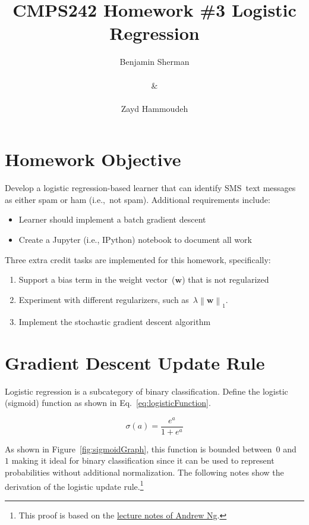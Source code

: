 \documentclass{report}
\title{\textbf{CMPS242 Homework \#3 \textendash{} Logistic Regression}}
\author{Benjamin Sherman \\~\\ \& \\~\\ Zayd Hammoudeh}
\newcommand{\norm}[1]{\left\lVert#1\right\rVert}
\newcommand{\w}{\mathbf{w}}
\begin{document}
  \maketitle
  
  \suppressfloats
  \section{Homework Objective}
  
  Develop a logistic regression-based learner that can identify SMS~text messages as either spam or ham (i.e.,~not spam).  Additional requirements include:
  
  \begin{itemize}
    \setlength\itemsep{0pt}
    \item Learner should implement a batch gradient descent
    \item Create a Jupyter (i.e., IPython) notebook to document all work
  \end{itemize}

  \noindent
  Three extra credit tasks are implemented for this homework, specifically:
  
  \begin{enumerate}
    \setlength\itemsep{0pt}
    \item Support a bias term in the weight vector~($\mathbf{w}$) that is not regularized
    \item Experiment with different regularizers, such as~$\lambda\norm{\w}_1$.
    \item Implement the stochastic gradient descent algorithm
  \end{enumerate}
 
  \section{Gradient Descent Update Rule}
  
  Logistic regression is a subcategory of binary classification.  Define the logistic (sigmoid) function as shown in Eq.~\eqref{eq:logisticFunction}.
  
  \begin{equation}
    \sigma(a) = \frac{e^{a}}{1+e^{a}}\label{eq:logisticFunction}
  \end{equation}
  
  \noindent
  As shown in Figure~\ref{fig:sigmoidGraph}, this function is bounded between~$0$ and~$1$ making it ideal for binary classification since it can be used to represent probabilities without additional normalization. The following notes show the derivation of the logistic update rule.\footnote{This proof is based on the \href{http://cs229.stanford.edu/notes/cs229-notes1.pdf}{lecture notes of Andrew Ng}.}
  
\end{document}
